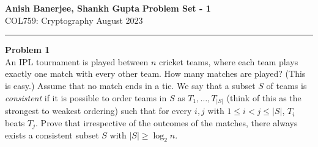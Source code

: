 \documentclass[a4paper, 11pt]{article}
\newenvironment{problem}[2][Problem]
    { \begin{mdframed}[backgroundcolor=gray!20] \textbf{#1 #2} \\}
    {  \end{mdframed}}
\newcommand{\hr}{\noindent\rule{7in}{2.8pt}}
\begin{document}
\noindent
\large\textbf{Anish Banerjee, Shankh Gupta} \hfill \textbf{Problem Set - 1}   \\
\normalsize COL759: Cryptography \hfill August 2023\\
\hr
\begin{problem}{1}
An IPL tournament is played between $n$ cricket teams, where each team plays exactly one match with every other team. How many matches are played? (This is easy.) Assume that no match ends in a tie. We say that a subset $S$ of teams is \textit{consistent} if it is possible to order teams in $S$ as $T_1,\ldots,T_{|S|}$ (think of this as the strongest to weakest ordering) such that for every $i,j$ with $1\leq i<j\leq|S|$, $T_i$ beats $T_j$. Prove that irrespective of the outcomes of the matches, there always exists a consistent subset $S$ with $|S|\geq\log_2 n$.
\end{problem}
\end{document}
